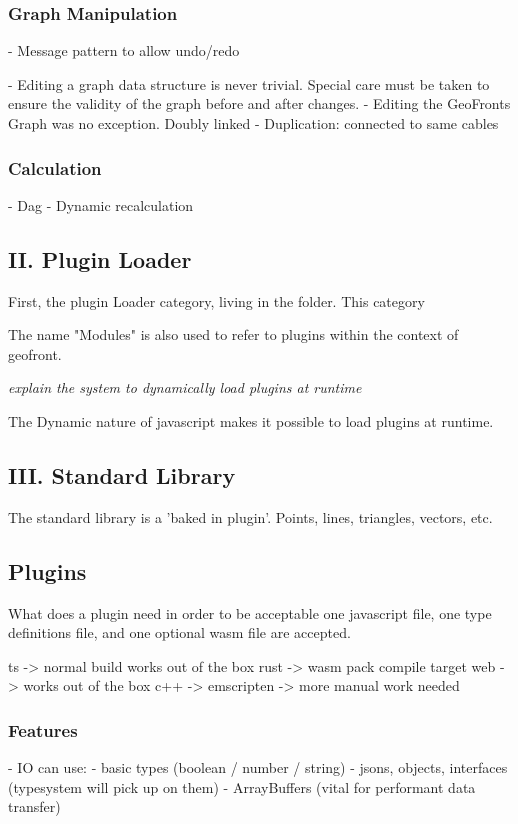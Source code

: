 \subsubsection*{Graph Manipulation}


- Message pattern to allow undo/redo

- Editing a graph data structure is never trivial. Special care must be taken to ensure the validity of the graph before and after changes. 
  - Editing the GeoFronts Graph was no exception. Doubly linked
  - Duplication: connected to same cables
   
\subsubsection*{Calculation}
  - Dag
  - Dynamic recalculation 




\subsection{ II. Plugin Loader } 
First, the plugin Loader category, living in the  folder. This category 

The name "Modules" is also used to refer to plugins within the context of geofront.


\emph{explain the system to dynamically load plugins at runtime}

The Dynamic nature of javascript makes it possible to load plugins at runtime. 



\subsection{ III. Standard Library }

The standard library is a 'baked in plugin'.
Points, lines, triangles, vectors, etc.

\subsection{ Plugins }
What does a plugin need in order to be acceptable
one javascript file, one type definitions file, and one optional wasm file are accepted. 

ts -> normal build works out of the box
rust -> wasm pack compile target web -> works out of the box 
c++ -> emscripten -> more manual work needed 

\subsubsection{Features}
- IO can use:
  - basic types (boolean / number / string)
  - jsons, objects, interfaces (typesystem will pick up on them)
  - ArrayBuffers (vital for performant data transfer)







